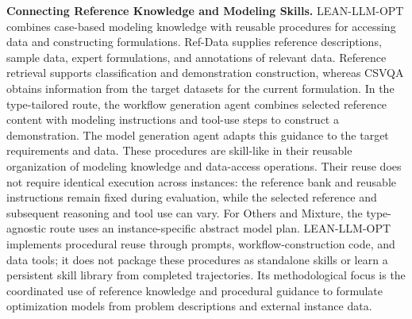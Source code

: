 {\color{blue}
\noindent\textbf{Connecting Reference Knowledge and Modeling Skills.}
LEAN-LLM-OPT combines case-based modeling knowledge with reusable
procedures for accessing data and constructing formulations.
Ref-Data supplies reference descriptions, sample data, expert
formulations, and annotations of relevant data. Reference retrieval
supports classification and demonstration construction, whereas
CSVQA obtains information from the target datasets for the current
formulation. In the type-tailored route, the workflow generation
agent combines selected reference content with modeling instructions
and tool-use steps to construct a demonstration. The model generation
agent adapts this guidance to the target requirements and data.
These procedures are skill-like in their reusable organization of
modeling knowledge and data-access operations. Their reuse does not
require identical execution across instances: the reference bank
and reusable instructions remain fixed during evaluation, while
the selected reference and subsequent reasoning and tool use can
vary. For Others and Mixture, the type-agnostic route uses an
instance-specific abstract model plan. LEAN-LLM-OPT implements
procedural reuse through prompts, workflow-construction code, and
data tools; it does not package these procedures as standalone
skills or learn a persistent skill library from completed
trajectories. Its methodological focus is the coordinated use of
reference knowledge and procedural guidance to formulate optimization
models from problem descriptions and external instance data.
}
